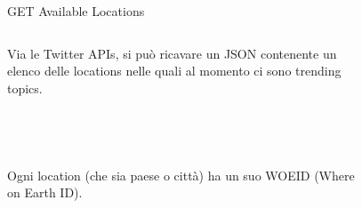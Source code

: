 \documentclass[xcolor=svgnames, aspectratio=169]{beamer}
\begin{document}
\begin{frame}{GET Available Locations}
    \fontsize{10pt}{10}\selectfont
    \begin{columns}[t]
        Via le Twitter APIs, si può ricavare un JSON contenente un elenco delle locations nelle quali al momento ci sono trending topics.\\~\\~\\~\\~\\
        
        Ogni location (che sia paese o città) ha un suo WOEID (Where on Earth ID).
        
        \vspace*{-48pt}
        \begin{figure}[H]
            \centering
            \noindent{}
        \end{figure}
    \end{columns}
\end{frame}

\end{document}
